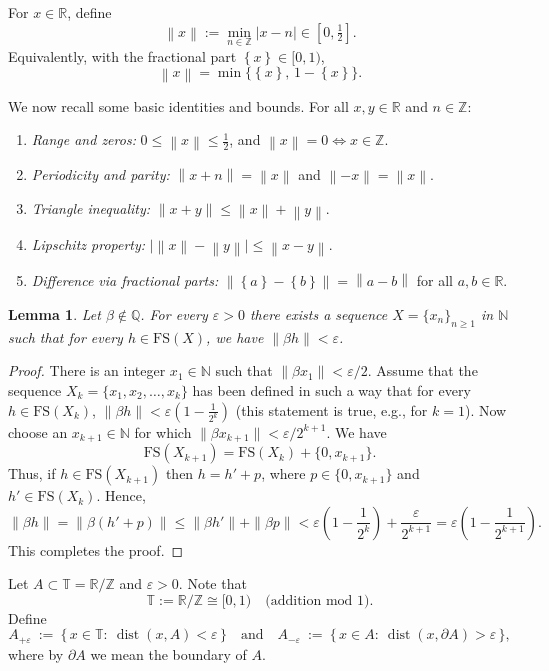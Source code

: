\documentclass[11pt]{article}
\newtheorem{lemma}[theorem]{Lemma}
\def\Z{{\mathbb  Z}}
\def\R{{\mathbb  R}}
\def\N{{\mathbb  N}}
\def\R{\mathbb{R}}
\def \R{{\mathbb R}}
\def \Z{{\mathbb Z}}
\def\Q{\mathbb{Q}}
\newcommand{\dist}{\operatorname{dist}}
\newcommand{\fr}[1]{\left\{#1\right\}} %
\newcommand{\nnorm}[1]{\left\|#1\right\|}
\theoremstyle{definition}
\newcommand{\T}{\mathbb T}
\begin{document}
For $x\in\mathbb R$, define
\[
\nnorm{x}:=\min_{n\in\mathbb Z}|x-n|\in[0,\tfrac12].
\]
Equivalently, with the fractional part $\fr{x}\in[0,1)$,
\[
\nnorm{x}=\min\{\fr{x},\,1-\fr{x}\}.
\]


We now recall some basic identities and bounds.
For all $x,y\in\R$ and $n\in\Z$:
\begin{enumerate}
\item \emph{Range and zeros:} $0\le \nnorm{x}\le \tfrac12$, and $\nnorm{x}=0 \iff x\in\Z$.
\item \emph{Periodicity and parity:} $\nnorm{x+n}=\nnorm{x}$ and $\nnorm{-x}=\nnorm{x}$.
\item \emph{Triangle inequality:} $\nnorm{x+y}\le \nnorm{x}+\nnorm{y}$.
\item \emph{Lipschitz property:} $\big|\nnorm{x}-\nnorm{y}\big|\le \nnorm{x-y}$.
\item \emph{Difference via fractional parts:} $\nnorm{\fr{a}-\fr{b}}=\nnorm{a-b}$ for all $a,b\in\R$.
\end{enumerate}


\begin{lemma}\label{lm2.2}
Let $\beta \notin \Q$. For every $\varepsilon>0$ there exists a sequence $X=\{x_n\}_{n\ge 1}$ in $\mathbb{N}$ such that for every $h\in \mathrm{FS}(X)$, we have $\|\beta h\|<\varepsilon$.
\end{lemma}
\begin{proof}
There is an integer $x_1\in \N$ such that $\|\beta x_1\|<\varepsilon/2$. Assume that the sequence $X_{k}=\{x_1,x_2,\dots ,x_{k}\}$ has been defined in such a way that for every $h\in \mathrm{FS}(X_k)$,  $\|\beta h\|<\varepsilon\left(1-\frac{1}{2^k}\right)$ (this statement is true, e.g., for $k=1$). Now choose an $x_{k+1}\in \N$ for which $\|\beta x_{k+1}\|<\varepsilon/2^{k+1}$. We have
$$
\mathrm{FS}(X_{k+1})=\mathrm{FS}(X_{k})+\{0,x_{k+1}\}.
$$
Thus, if $h\in \mathrm{FS}(X_{k+1})$ then $h=h'+p$, where $p\in \{0,x_{k+1}\}$ and $h'\in \mathrm{FS}(X_{k})$. Hence, \[\|\beta h\|= \| \beta(h'+p)\|\leq \|\beta h'\|+\|\beta p\|<\varepsilon\left(1-\frac{1}{2^k}\right)+\frac{\varepsilon}{2^{k+1}}=\varepsilon\left(1-\frac{1}{2^{k+1}}\right).\]
This completes the proof.
\end{proof}


Let $A\subset\T=\R/\Z$ and $\varepsilon>0$. Note that 
\[
\mathbb T := \mathbb R/\mathbb Z \cong [0,1)\quad\text{(addition mod $1$).}
\]
Define
\[
A_{+\varepsilon}\ :=\ \{\,x\in\T:\ \dist(x,A)<\varepsilon\,\}
\quad\text{and}\quad
A_{-\varepsilon}\ :=\ \{\,x\in A:\ \dist(x,\partial A)>\varepsilon\,\},
\]
where by $\partial A$ we mean the boundary of $A$. 
\end{document}
